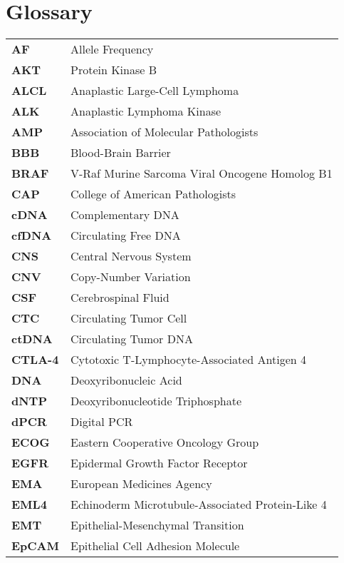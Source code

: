 \chapter*{Glossary}

\footnotesize
\begin{longtable}[l]{l l}
    \textbf{AF} & Allele Frequency \\
    \textbf{AKT} & Protein Kinase B \\ 
    \textbf{ALCL} & Anaplastic Large-Cell Lymphoma \\
    \textbf{ALK} & Anaplastic Lymphoma Kinase \\
    \textbf{AMP} & Association of Molecular Pathologists \\
    \textbf{BBB} & Blood-Brain Barrier \\
    \textbf{BRAF} & V-Raf Murine Sarcoma Viral Oncogene Homolog B1 \\
    \textbf{CAP} & College of American Pathologists \\
    \textbf{cDNA} & Complementary DNA \\
    \textbf{cfDNA} & Circulating Free DNA \\
    \textbf{CNS} & Central Nervous System \\
    \textbf{CNV} & Copy-Number Variation \\
    \textbf{CSF} & Cerebrospinal Fluid \\
    \textbf{CTC} & Circulating Tumor Cell \\
    \textbf{ctDNA} & Circulating Tumor DNA \\
    \textbf{CTLA-4} & Cytotoxic T-Lymphocyte-Associated Antigen 4 \\
    \textbf{DNA} & Deoxyribonucleic Acid \\
    \textbf{dNTP} & Deoxyribonucleotide Triphosphate \\
    \textbf{dPCR} & Digital PCR \\
    \textbf{ECOG} & Eastern Cooperative Oncology Group \\
    \textbf{EGFR} & Epidermal Growth Factor Receptor \\
    \textbf{EMA} & European Medicines Agency \\
    \textbf{EML4} & Echinoderm Microtubule-Associated Protein-Like 4 \\
    \textbf{EMT} & Epithelial-Mesenchymal Transition \\
    \textbf{EpCAM} & Epithelial Cell Adhesion Molecule \\

\end{longtable}
